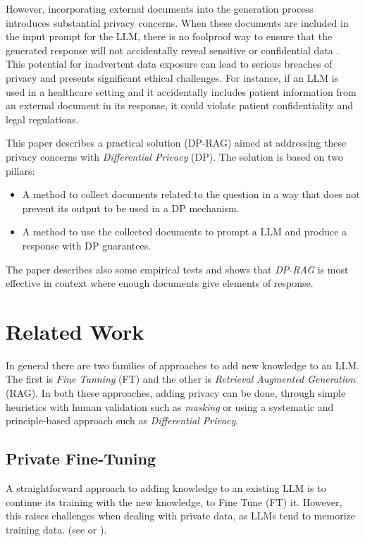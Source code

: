 \documentclass[conference]{IEEEtran}
\begin{document}
However, incorporating external documents into the generation process
introduces substantial privacy concerns. When these documents are
included in the input prompt for the LLM, there is no foolproof way to
ensure that the generated response will not accidentally reveal
sensitive or confidential data \cite{ref-qi2024followinstructionspillbeans}. This potential for
inadvertent data exposure can lead to serious breaches of privacy and
presents significant ethical challenges. For instance, if an LLM is used
in a healthcare setting and it accidentally includes patient information
from an external document in its response, it could violate patient
confidentiality and legal regulations.

This paper describes a practical solution (DP-RAG) aimed at addressing
these privacy concerns with \emph{Differential Privacy} (DP). The
solution is based on two pillars:

\begin{itemize}
\item
  A method to collect documents related to the question in a way that
  does not prevent its output to be used in a DP mechanism.
\item
  A method to use the collected documents to prompt a LLM and produce a
  response with DP guarantees.
\end{itemize}

The paper describes also some empirical tests and shows that
\emph{DP-RAG} is most effective in context where enough documents give
elements of response.

\section{Related Work}\label{related-work}

In general there are two families of approaches to add new knowledge to
an LLM. The first is \emph{Fine Tunning} (FT) and the other is
\emph{Retrieval Augmented Generation} (RAG). In both these approaches,
adding privacy can be done, through simple heuristics with human
validation such as \emph{masking} or using a systematic and
principle-based approach such as \emph{Differential Privacy}.

\subsection{Private Fine-Tuning}\label{private-fine-tuning}

A straightforward approach to adding knowledge to an existing LLM is to
continue its training with the new knowledge, to Fine Tune (FT) it.
However, this raises challenges when dealing with private data, as LLMs
tend to memorize training data. (see \cite{ref-shokri2017} or \cite{ref-carlini2021}).
\end{document}
